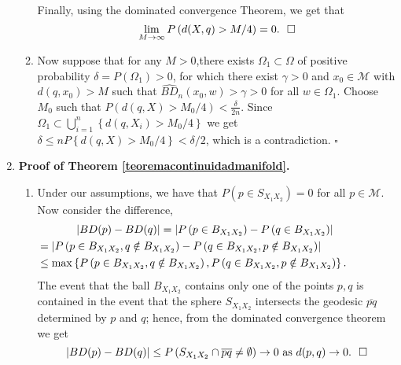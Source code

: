 \documentclass[a4paper]{article}
\newcommand*{\QEDB}{\hfill\ensuremath{\square}}%
\numberwithin{equation}{section}
\newtheorem{remark}{Remark}
\newcommand{\M}{\mbox{$\mathcal{M}$}}
\begin{document}
\begin{enumerate}[label=(\Alph*)]
\begin{enumerate}[label=(\alph*)]
Finally, using the dominated convergence Theorem, we get that 
$$\lim_{M \to \infty} P\left( d(X,q) > M/ 4 \right) =0. \ \ \QEDB $$ 
\item Now suppose that for any $M>0$,there exists $\Omega_1 \subset \Omega$ of positive probability $\delta=P( \Omega_1)>0$, for which there exist $ \gamma>0$  and $ x_0 \in \M$ with $d(q,x_0)>M$ such that $\widehat{BD}_n(x_0,w) > \gamma>0$ for all $w \in \Omega_1$. 
Choose $M_0$ such that $P\left(d(q,X)> M_0/4 \right)< \frac{\delta}{2n} $.
 Since $\Omega_1 \subset \bigcup_{i=1}^n \left\{ d(q,X_i) > M_0/4 \right\}$ we get $\delta \leq  n P \left\{ d(q,X) > M_0/4 \right\} <\delta/2$, which is a contradiction. 
\QEDB
\end{enumerate}
\item \textbf{Proof of Theorem \ref{teoremacontinuidadmanifold}.}
\begin{enumerate}[label=(\alph*)]
\item Under our assumptions, we have that $P(p \in S_{X_1X_2})=0$
 for all $p \in \M$. Now consider the difference,
 \begin{align*}
 \vert BD(p) -  BD(q) \vert = \left \vert P \left( p \in B_{X_1X_2}  \right) - P \left( q \in B_{X_1X_2}  \right)\right \vert \\
 & \hspace{- 9.5 cm}= \left \vert P \left( p \in B_{X_1X_2}, q \notin B_{X_1X_2}  \right) - P \left( q \in B_{X_1X_2}, p \notin B_{X_1X_2}  \right) \right \vert \\
 & \hspace{- 9.5 cm} \leq \max \left \{ P \left( p \in B_{X_1X_2}, q \notin B_{X_1X_2}  \right) ,  P \left( q \in B_{X_1X_2}, p \notin B_{X_1X_2}  \right) \right\}.
 \end{align*}
The event that the ball $B_{X_1X_2}$ contains only one of the points $p, q$ is contained in the event that the sphere $S_{X_1 X_2}$  intersects the geodesic  $\overline{pq}$ determined by $p$ and $q$; hence, from the dominated convergence theorem we get 
$$
\vert BD(p) -  BD(q) \vert \leq P \left(S_{X_1X_2} \cap \overline{pq} \neq \emptyset \right) \rightarrow 0 \ \mbox{as} \ d(p,q) \rightarrow 0.  \ \ \QEDB
$$ 

\end{enumerate}
\end{enumerate}
\end{document}
